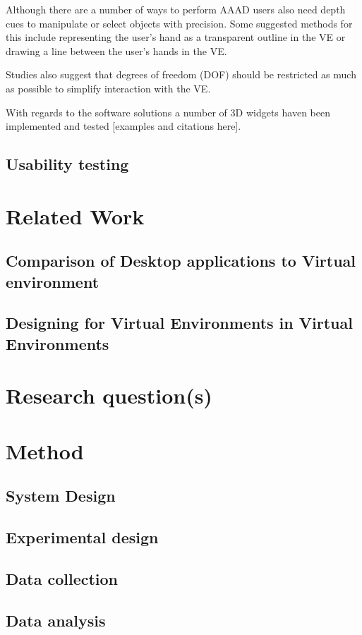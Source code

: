 \documentclass{sig-alternate-05-2015}
\begin{document}
 Although there are a number of ways to perform AAAD users also need depth cues to manipulate or select objects with precision.\cite{Schultheis2012} Some suggested methods for this include representing the user's hand as a transparent outline in the VE\cite{Hinckley1994} or drawing a line between the user's hands in the VE.\cite{Schultheis2012}
 
 
 Studies also suggest that degrees of freedom (DOF) should be restricted as much as possible to simplify interaction with the VE.\cite{Bowman2001}
 
 
  With regards to the software solutions a number of 3D widgets haven been implemented and tested [examples and citations here].
 

\subsection{Usability testing}
\section{Related Work}
\subsection{Comparison of Desktop applications to Virtual environment}
\subsection{Designing for Virtual Environments in Virtual Environments}
\section{Research question(s)}
\section{Method}
\subsection{System Design}
\subsection{Experimental design}
\subsection{Data collection}
\subsection{Data analysis}
\end{document}
